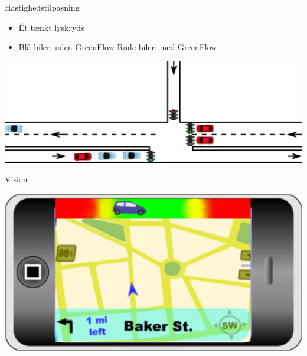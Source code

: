 \begin{frame}{Hastighedstilpasning}
\begin{itemize}
\item Ét tænkt lyskryds
\item Blå biler: uden GreenFlow \hspace{8mm} Røde biler: med GreenFlow
\end{itemize}
\vspace{3mm}
\includegraphics[width=1\textwidth]{../images/introNetworkSimple2.png}
\end{frame}

\begin{frame}{Vision}
\begin{center}
\includegraphics[width=1\textwidth]{../images/product.png}
\end{center}
\end{frame}


